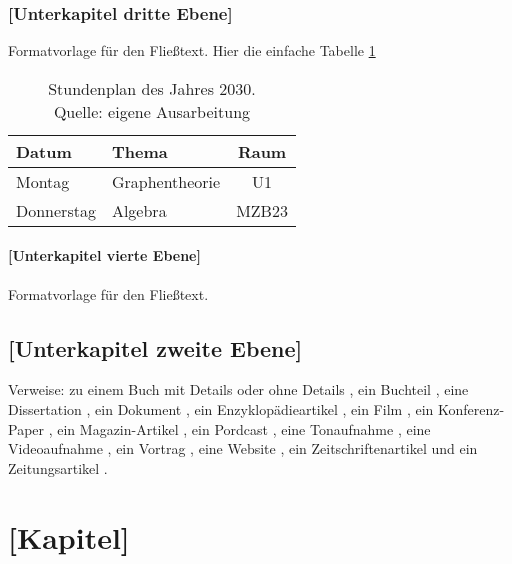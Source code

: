 \documentclass[a4paper,12pt,twoside]{scrreprt}
\begin{document}
\subsection{[Unterkapitel dritte Ebene]}
Formatvorlage für den Fließtext. Hier die einfache Tabelle \ref{tab:sp}

\begin{table}[htb]
  \centering
  \begin{tabular}{ | l | l |c|}
    \hline
    Datum      & Thema           & Raum \\
    \hline\hline
    Montag     & Graphentheorie  & U1   \\
    \hline
    Donnerstag & Algebra         & MZB23\\
    \hline
  \end{tabular}
  \caption[Stundenplan]{Stundenplan des Jahres 2030.\\Quelle: eigene Ausarbeitung}
  \label{tab:sp}
\end{table}

\subsubsection{[Unterkapitel vierte Ebene]}
Formatvorlage für den Fließtext.



\section{[Unterkapitel zweite Ebene]}

Verweise: zu einem Buch mit Details \cite[vgl.][Kapitel 2]{bathe_finite-elemente-methoden_1990} oder ohne Details \cite{bathe_finite-elemente-methoden_1990}, ein Buchteil \cite{areger_problem-based_2007}, eine Dissertation \cite{sporn_interaktives_2000}, ein Dokument \cite{industriellenvereinigung_beste_2014}, ein Enzyklopädieartikel \cite{brockhaus_kreativitat_1872}, ein Film \cite{de_wilde_through_2008}, ein Konferenz-Paper \cite{weber_podcasts._2006}, ein Magazin-Artikel \cite{autornachname1_magazinartikeltitel_1995}, ein Pordcast \cite{paulus_horen_????}, eine Tonaufnahme \cite{horowitz_horowitz_2003}, eine Videoaufnahme \cite{fhvlearningsupport_was_2008}, ein Vortrag \cite{kohls_literaturverwaltung_2008}, eine Website \cite{wedekind_von_2008}, ein Zeitschriftenartikel \cite{hofer_wir_2008} und ein Zeitungsartikel \cite{schenkel_tsunami_2012}.


\chapter{[Kapitel]}
\end{document}
